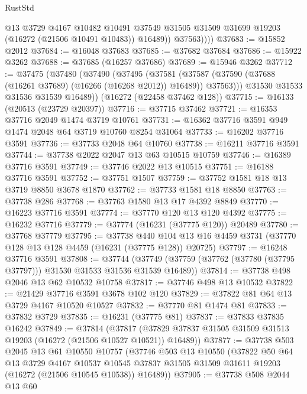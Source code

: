 \begin{lexlean}{RustStd}
\begin{coremodule}
                @13
                @3729
                @4167
                @10482
                @10491
                @37549
                @31505
                @31509
                @31699
                @19203
                (@16272 (@21506 @10491 @10483))
                @16489))
            @37563))))
@37683 := @15852 @2012
@37684 := @16048 @37683
@37685 := @37682 @37684
@37686 := @15922 @3262
@37688 := @37685 (@16257 @37686)
@37689 := @15946 @3262
@37712 := @37475
    (@37480
      (@37490
        (@37495
          (@37581 (@37587 (@37590 (@37688 (@16261 @37689) (@16266 (@16268 @2012)) @16489)) @37563)))
        @31530
        @31533
        @31536
        @31539
        @16489))
    (@16272 (@22458 @37462 @128))
@37715 := @16133 (@20513 (@23729 @20397))
@37716 := @37715 @37462
@37721 := @16353 @37716 @2049 @1474 @3719 @10761
@37731 := @16362 @37716 @3591 @949 @1474 @2048 @64 @3719 @10760 @8254 @31064
@37733 := @16202 @37716 @3591
@37736 := @37733 @2048 @64 @10760
@37738 := @16211 @37716 @3591
@37744 := @37738 @2022 @2047 @13 @63 @10515 @10759
@37746 := @16389 @37716 @3591
@37749 := @37746 @2022 @13 @10515
@37751 := @16188 @37716 @3591
@37752 := @37751 @1507
@37759 := @37752 @1581 @18 @13 @3719 @8850 @3678 @1870
@37762 := @37733 @1581 @18 @8850
@37763 := @37738 @286
@37768 := @37763 @1580 @13 @17 @4392 @8849
@37770 := @16223 @37716 @3591
@37774 := @37770 @120 @13 @120 @4392
@37775 := @16232 @37716
@37779 := @37774 (@16231 (@37775 @120)) @20489
@37780 := @37768 @37779
@37795 := @37738
    @440
    @104
    @13
    @16
    @4459
    @3731
    (@37770 @128 @13 @128 @4459 (@16231 (@37775 @128)) @20725)
@37797 := @16248 @37716 @3591
@37808 := @37744
    (@37749 (@37759 (@37762 (@37780 (@37795 @37797))) @31530 @31533 @31536 @31539 @16489))
@37814 := @37738 @498 @2046 @13 @62 @10532 @10758
@37817 := @37746 @498 @13 @10532
@37822 := @21429 @37716 @3591 @3678 @102 @120
@37829 := @37822 @81 @64 @13 @3729 @4167 @10520 @10527
@37832 := @37770 @81 @1474 @81
@37833 := @37832 @3729
@37835 := @16231 (@37775 @81)
@37837 := @37833 @37835 @16242
@37849 := @37814
    (@37817 (@37829 @37837 @31505 @31509 @31513 @19203 (@16272 (@21506 @10527 @10521)) @16489))
@37877 := @37738
    @503
    @2045
    @13
    @61
    @10550
    @10757
    (@37746
      @503
      @13
      @10550
      (@37822
        @50
        @64
        @13
        @3729
        @4167
        @10537
        @10545
        @37837
        @31505
        @31509
        @31611
        @19203
        (@16272 (@21506 @10545 @10538))
        @16489))
@37905 := @37738
    @508
    @2044
    @13
    @60

\end{coremodule}
\end{lexlean}
